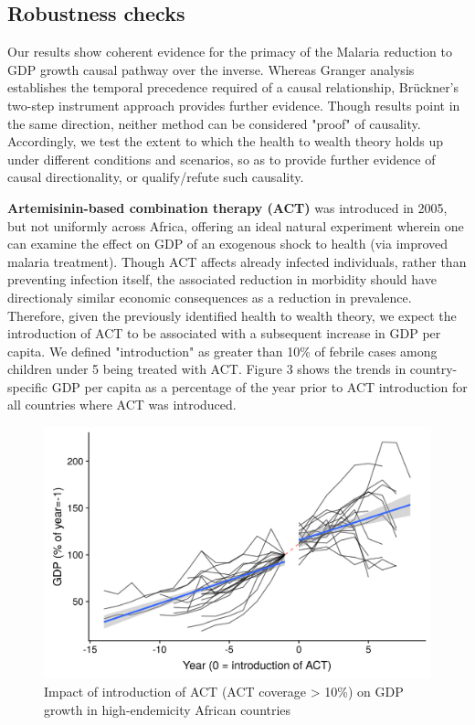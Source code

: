 \documentclass[9pt,twocolumn,twoside,lineno]{pnas-new}
\begin{document}




\subsection*{Robustness checks}

Our results show coherent evidence for the primacy of the Malaria reduction to GDP growth causal pathway over the inverse. Whereas Granger analysis establishes the temporal precedence required of a causal relationship, Brückner's two-step instrument approach provides further evidence. Though results point in the same direction, neither method can be considered "proof" of causality. Accordingly, we test the extent to which the health to wealth theory holds up under different conditions and scenarios, so as to provide further evidence of causal directionality, or qualify/refute such causality. 

\textbf{Artemisinin-based combination therapy (ACT)} was introduced in 2005, but not uniformly across Africa, offering an ideal natural experiment wherein one can examine the effect on GDP of an exogenous shock to health (via improved malaria treatment). Though ACT affects already infected individuals, rather than preventing infection itself, the associated reduction in morbidity should have directionaly similar economic consequences as a reduction in prevalence. Therefore, given the previously identified health to wealth theory, we expect the introduction of ACT to be associated with a subsequent increase in GDP per capita. We defined "introduction" as greater than 10\% of febrile cases among children under 5 being treated with ACT. Figure 3 shows the trends in country-specific GDP per capita as a percentage of the year prior to ACT introduction for all countries where ACT was introduced.


\begin{figure}%
\centering
\includegraphics[width=.95\linewidth]{../figures/act}
\caption{Impact of introduction of ACT (ACT coverage > 10\%) on GDP growth in high-endemicity African countries}
\label{fig:act}
\end{figure}
\end{document}
